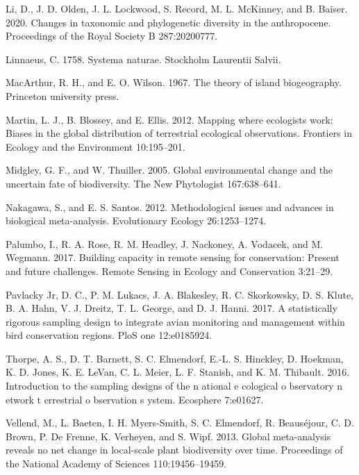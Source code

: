 \documentclass[
  12pt,
]{article}
\newlength{\cslhangindent}
\newenvironment{cslreferences}%
  {\setlength{\parindent}{0pt}%
  \everypar{\setlength{\hangindent}{\cslhangindent}}\ignorespaces}%
  {\par}
\begin{document}
\begin{cslreferences}
\leavevmode\hypertarget{ref-li2020changes}{}%
Li, D., J. D. Olden, J. L. Lockwood, S. Record, M. L. McKinney, and B. Baiser. 2020. Changes in taxonomic and phylogenetic diversity in the anthropocene. Proceedings of the Royal Society B 287:20200777.

\leavevmode\hypertarget{ref-linnaeus1758systema}{}%
Linnaeus, C. 1758. Systema naturae. Stockholm Laurentii Salvii.

\leavevmode\hypertarget{ref-macarthur1967theory}{}%
MacArthur, R. H., and E. O. Wilson. 1967. The theory of island biogeography. Princeton university press.

\leavevmode\hypertarget{ref-martin2012mapping}{}%
Martin, L. J., B. Blossey, and E. Ellis. 2012. Mapping where ecologists work: Biases in the global distribution of terrestrial ecological observations. Frontiers in Ecology and the Environment 10:195--201.

\leavevmode\hypertarget{ref-midgley2005global}{}%
Midgley, G. F., and W. Thuiller. 2005. Global environmental change and the uncertain fate of biodiversity. The New Phytologist 167:638--641.

\leavevmode\hypertarget{ref-nakagawa2012methodological}{}%
Nakagawa, S., and E. S. Santos. 2012. Methodological issues and advances in biological meta-analysis. Evolutionary Ecology 26:1253--1274.

\leavevmode\hypertarget{ref-palumbo2017building}{}%
Palumbo, I., R. A. Rose, R. M. Headley, J. Nackoney, A. Vodacek, and M. Wegmann. 2017. Building capacity in remote sensing for conservation: Present and future challenges. Remote Sensing in Ecology and Conservation 3:21--29.

\leavevmode\hypertarget{ref-pavlacky2017statistically}{}%
Pavlacky Jr, D. C., P. M. Lukacs, J. A. Blakesley, R. C. Skorkowsky, D. S. Klute, B. A. Hahn, V. J. Dreitz, T. L. George, and D. J. Hanni. 2017. A statistically rigorous sampling design to integrate avian monitoring and management within bird conservation regions. PloS one 12:e0185924.

\leavevmode\hypertarget{ref-thorpe2016introduction}{}%
Thorpe, A. S., D. T. Barnett, S. C. Elmendorf, E.-L. S. Hinckley, D. Hoekman, K. D. Jones, K. E. LeVan, C. L. Meier, L. F. Stanish, and K. M. Thibault. 2016. Introduction to the sampling designs of the n ational e cological o bservatory n etwork t errestrial o bservation s ystem. Ecosphere 7:e01627.

\leavevmode\hypertarget{ref-vellend2013global}{}%
Vellend, M., L. Baeten, I. H. Myers-Smith, S. C. Elmendorf, R. Beauséjour, C. D. Brown, P. De Frenne, K. Verheyen, and S. Wipf. 2013. Global meta-analysis reveals no net change in local-scale plant biodiversity over time. Proceedings of the National Academy of Sciences 110:19456--19459.


\end{cslreferences}
\end{document}
